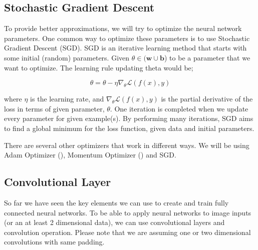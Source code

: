
\subsection{Stochastic Gradient Descent}
To provide better approximations, we will try to optimize the neural network parameters. One common way to optimize these parameters is to use Stochastic Gradient Descent (SGD). SGD is an iterative learning method that starts with some initial (random) parameters. Given $\theta \in (\mathbf{w} \cup \mathbf{b}$) to be a parameter that we want to optimize. The learning rule updating theta would be;

$$ \theta = \theta- \eta \nabla_\theta{\mathcal{L}(f(x), y)} $$

where $\eta$ is the learning rate, and $\nabla_\theta{\mathcal{L}(f(x), y)}$ is the partial derivative of the loss in terms of given parameter, $\theta$. One iteration is completed when we update every parameter for given example(s). By performing many iterations, SGD aims to find a global minimum for the loss function, given data and initial parameters.

There are several other optimizers that work in different ways. We will be using Adam Optimizer (\cite{kingma2014adam}), Momentum Optimizer (\cite{qian1999momentum}) and SGD.

\iffalse
\subsection{Training a Neural Network}
Training is the process of learning the best weights given a set of samples. When describing the training process of a model, we will define the configuration we have used. This configuration consists of number of Epochs, batch size, training/validation datasets, loss, optimizer and finally network configuration. 
We will start by defining the network configuration. The network configuration is basically setting up the neural network graph and its operations. Starting from the input nodes we define every layer up to the output layer. To do that, first we need to define our training dataset because the training dataset defines the shape of our input and output layers. Then we will define a loss for the output layer. Using this loss we will define our optimizer. 
\fi

\subsection{Convolutional Layer}
So far we have seen the key elements we can use to create and train fully connected neural networks. To be able to apply neural networks to image inputs (or an at least 2 dimensional data), we can use convolutional layers and convolution operation. Please note that we are assuming one or two dimensional convolutions with same padding. 

